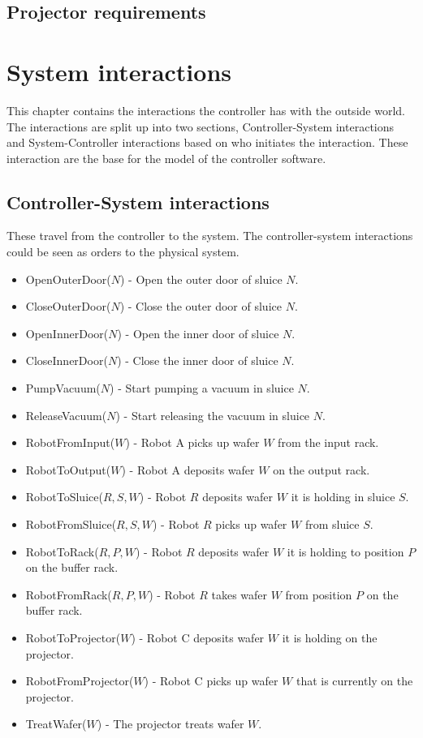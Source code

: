 \documentclass[12pt]{report}
\begin{document}
	\section{Projector requirements}
	\begin{itemize}
	\end{itemize}
	
	\chapter{System interactions}
	This chapter contains the interactions the controller has with the outside world. The interactions are split up into two sections, Controller-System interactions and System-Controller interactions based on who initiates the interaction. These interaction are the base for the model of the controller software.
\section{Controller-System interactions}
These travel from the controller to the system. The controller-system interactions could be seen as orders to the physical system.
	\begin{itemize}
\item OpenOuterDoor($N$) - Open the outer door of sluice $N$.
\item CloseOuterDoor($N$) - Close the outer door of sluice $N$.
\item OpenInnerDoor($N$) - Open the inner door of sluice $N$.
\item CloseInnerDoor($N$) - Close the inner door of sluice $N$.
\item PumpVacuum($N$) - Start pumping a vacuum in sluice $N$.
\item ReleaseVacuum($N$) - Start releasing the vacuum in sluice $N$.

\item RobotFromInput($W$) - Robot A picks up wafer $W$ from the input rack.
\item RobotToOutput($W$) - Robot A deposits wafer $W$ on the output rack.

\item RobotToSluice($R, S, W$) - Robot $R$ deposits wafer $W$ it is holding in sluice $S$.
\item RobotFromSluice($R, S, W$) - Robot $R$ picks up wafer $W$ from sluice $S$.

\item RobotToRack($R, P, W$) - Robot $R$ deposits wafer $W$ it is holding to position $P$ on the buffer rack.
\item RobotFromRack($R, P, W$) - Robot $R$ takes wafer $W$ from position $P$ on the buffer rack.

\item RobotToProjector($W$) - Robot C deposits wafer $W$ it is holding on the projector.
\item RobotFromProjector($W$) - Robot C picks up wafer $W$ that is currently on the projector.

\item TreatWafer($W$) - The projector treats wafer $W$.
\end{itemize}
\end{document}
